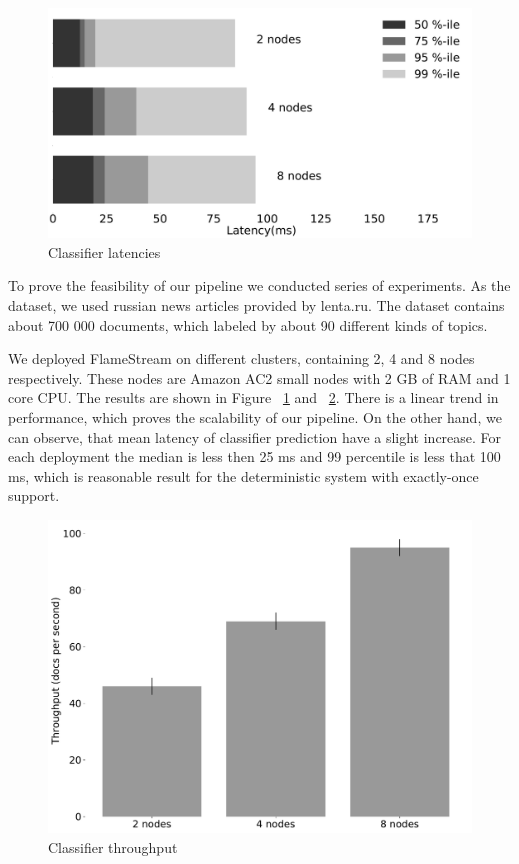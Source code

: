 \label {fs-experiments}

\begin{figure}[htbp]
  \centering
  \includegraphics[scale=0.1]{pics/classifier_latencies}
  \caption{Classifier latencies}
  \label {latencies}
\end{figure}

To prove the feasibility of our pipeline we conducted series of experiments. As the dataset, we used russian news articles provided by lenta.ru. The dataset contains about 700 000 documents, which labeled by about 90 different kinds of topics. 

We deployed FlameStream on different clusters, containing 2, 4 and 8 nodes respectively. These nodes are Amazon AC2 small nodes with 2 GB of RAM and 1 core CPU. The results are shown in Figure ~\ref{latencies} and ~\ref{throughput}. There is a linear trend in performance, which proves the scalability of our pipeline. On the other hand, we can observe, that mean latency of classifier prediction have a slight increase. For each deployment the median is less then 25 ms and 99 percentile is less that 100 ms, which is reasonable result for the deterministic system with exactly-once support.

\begin{figure}[htbp]
  \centering
  \includegraphics[scale=0.2]{pics/classifier_throughput}
  \caption{Classifier throughput}
  \label {throughput}
\end{figure}